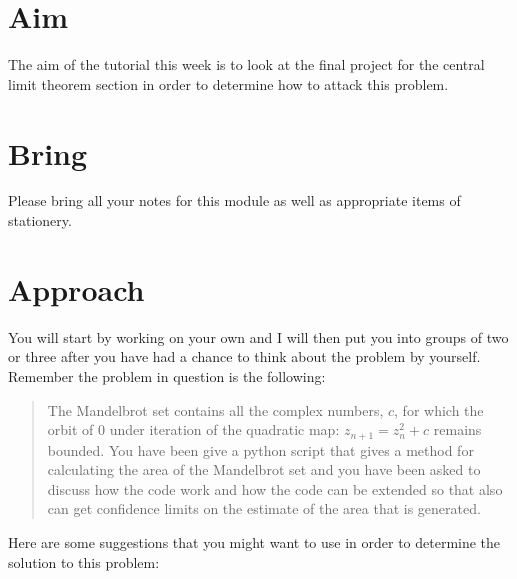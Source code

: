 \documentclass[a4paper]{article}
\begin{document}
\section{Aim}

The aim of the tutorial this week is to look at the final project for the central limit theorem section in order to determine how to attack this problem.

\section{Bring}

Please bring all your notes for this module as well as appropriate items of stationery.

\section{Approach}

You will start by working on your own and I will then put you into groups of two or three after you have had a chance to think about the problem by yourself.    Remember the problem in question is 
the following:

\begin{quotation}
The Mandelbrot set contains all the complex numbers, $c$, for which the orbit of 0 under iteration of the quadratic map: $z_{n+1} = z_n^2 + c$ remains bounded.  You have been give a python script that 
gives a method for calculating the area of the Mandelbrot set and you have been asked to discuss how the code work and how the code can be extended so that also can get confidence limits on the 
estimate of the area that is generated.
\end{quotation}

Here are some suggestions that you might want to use in order to determine the solution to this problem:
\end{document}
